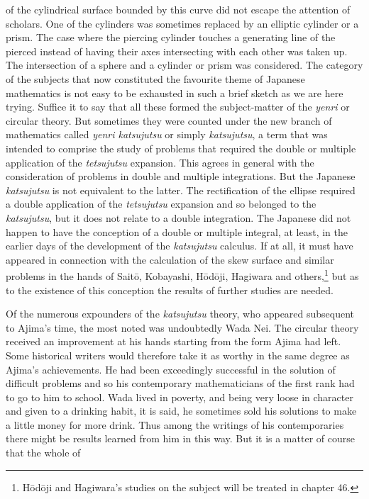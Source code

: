 \documentclass[11pt]{article}
\newcommand{\scanpage}[2]{\clearpage\setcounter{footnote}{0}\noindent{\footnotesize\color{gray}PDF page #1 · #2}\par\medskip}
\newcommand{\scanfooter}{}
\begin{document}
\scanpage{0187}{Chapter 22, printed page 173}
of the cylindrical surface bounded by this curve did not escape the attention of scholars. One of the cylinders was sometimes replaced by an elliptic cylinder or a prism. The case where the piercing cylinder touches a generating line of the pierced instead of having their axes intersecting with each other was taken up. The intersection of a sphere and a cylinder or prism was considered. The category of the subjects that now constituted the favourite theme of Japanese mathematics is not easy to be exhausted in such a brief sketch as we are here trying. Suffice it to say that all these formed the subject-matter of the \emph{yenri} or circular theory. But sometimes they were counted under the new branch of mathematics called \emph{yenri katsujutsu} or simply \emph{katsujutsu}, a term that was intended to comprise the study of problems that required the double or multiple application of the \emph{tetsujutsu} expansion. This agrees in general with the consideration of problems in double and multiple integrations. But the Japanese \emph{katsujutsu} is not equivalent to the latter. The rectification of the ellipse required a double application of the \emph{tetsujutsu} expansion and so belonged to the \emph{katsujutsu}, but it does not relate to a double integration. The Japanese did not happen to have the conception of a double or multiple integral, at least, in the earlier days of the development of the \emph{katsujutsu} calculus. If at all, it must have appeared in connection with the calculation of the skew surface and similar problems in the hands of Saitō, Kobayashi, Hōdōji, Hagiwara and others,\footnote{Hōdōji and Hagiwara's studies on the subject will be treated in chapter 46.} but as to the existence of this conception the results of further studies are needed.

Of the numerous expounders of the \emph{katsujutsu} theory, who appeared subsequent to Ajima's time, the most noted was undoubtedly Wada Nei. The circular theory received an improvement at his hands starting from the form Ajima had left. Some historical writers would therefore take it as worthy in the same degree as Ajima's achievements. He had been exceedingly successful in the solution of difficult problems and so his contemporary mathematicians of the first rank had to go to him to school. Wada lived in poverty, and being very loose in character and given to a drinking habit, it is said, he sometimes sold his solutions to make a little money for more drink. Thus among the writings of his contemporaries there might be results learned from him in this way. But it is a matter of course that the whole of
\scanfooter
\end{document}

